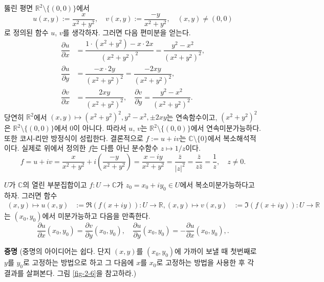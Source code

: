 \begin{salt_example} \label{example-2-6}
뚫린 평면 $\mathbb R^2 \setminus \{(0,0)\}$에서 
\[
u(x,y) := \dfrac{x}{x^2+y^2}, \quad
v(x,y) := \dfrac{-y}{x^2+y^2}, \quad (x,y)\ne(0,0)
\]
로 정의된 함수 
$u$, $v$를 생각하자.
그러면 다음 편미분을 얻는다.
\begin{align*}
\dfrac{\partial u}{\partial x} &= \dfrac{1\cdot(x^2+y^2)-x\cdot 2x}{(x^2+y^2)^2}
= \dfrac{y^2-x^2}{(x^2+y^2)^2}, \\
\dfrac{\partial u}{\partial y} &= \dfrac{-x\cdot 2y}{(x^2+y^2)^2}
= \dfrac{-2xy}{(x^2+y^2)^2}, \\
\dfrac{\partial v}{\partial x} &= \dfrac{2xy}{(x^2+y^2)^2}, \quad
\dfrac{\partial v}{\partial y} = \dfrac{y^2-x^2}{(x^2+y^2)^2}.
\end{align*}
당연히 $\mathbb R^2$에서 $(x,y) \mapsto (x^2+y^2)^2, y^2-x^2, \pm 2xy$는 
연속함수이고, $(x^2+y^2)^2$은 $\mathbb R^2 \setminus \{(0,0)\}$에서 
$0$이 아니다.
따라서 $u$, $v$는 $\mathbb R^2 \setminus \{(0,0)\}$에서 
연속미분가능하다.
또한 코시-리만 방정식이 성립한다. 
결론적으로 $f:=u+iv$는 $\mathbb C\setminus\{0\}$에서 
복소해석적이다.
실제로 위에서 정의한 $f$는 다름 아닌 분수함수 $z\mapsto 1/z$이다.
\[
f=u+iv= \dfrac x{x^2+y^2}+i\left(\dfrac{-y}{x^2+y^2}\right)
= \dfrac{x-iy}{x^2+y^2} = \dfrac{\bar z}{|z|^2} = \dfrac{\bar z}{z \bar z}
= \dfrac  1z, \quad z\ne 0.
\]
\end{salt_example}

\begin{salt_theorem}\label{thm-2-1}
$U$가 $\mathbb C$의 열린 부분집합이고
$f:U\to \mathbb C$가 $z_0=x_0+iy_0\in U$에서 복소미분가능하다고 하자.
그러면 함수
\begin{align*}
(x,y) \mapsto u(x,y) & := \Re(f(x+iy)): U\to \mathbb R,
(x,y) \mapsto v(x,y) & := \Im(f(x+iy)): U\to \mathbb R
\end{align*}
는 $(x_0, y_0)$에서 미분가능하고 다음을 만족한다.
\begin{equation} \label{eq-2-3}
\dfrac{\partial u}{\partial x}(x_0,y_0) = \dfrac{\partial v}{\partial y}(x_0,y_0),
\quad
\dfrac{\partial u}{\partial y}(x_0,y_0) = - \dfrac{\partial u}{\partial x}(x_0,y_0),.
\end{equation}
\end{salt_theorem}

{\bf 증명}
(중명의 아이디어는 쉽다. 단지 $(x,y)$를 $(x_0, y_0)$에 가까이 보낼 때
첫번째로 $y$를 $y_0$로 고정하는 방법으로 하고 그 다음에 
$x$를 $x_0$로 고정하는 방법을 사용한 후 각 결과를 살펴본다.
그림 \ref{fig-2-6}을 참고하라.)

